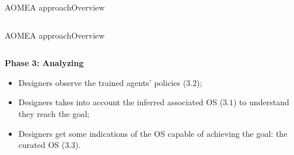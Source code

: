 \begin{frame}{AOMEA approach}{Overview}
\begin{columns}
    \end{columns}


\end{frame}

\begin{frame}{AOMEA approach}{Overview}

    \begin{columns}

        \begin{column}{0.5\textwidth}

            \textbf{Phase 3: Analyzing}

            \begin{itemize}
                \item Designers observe the trained agents' policies ($3.2$);
                \item Designers takes into account the inferred associated OS ($3.1$) to understand they reach the goal;
                \item Designers get some indications of the OS capable of achieving the goal: the curated OS ($3.3$).
            \end{itemize}


        \end{column}


\end{columns}
\end{frame}
